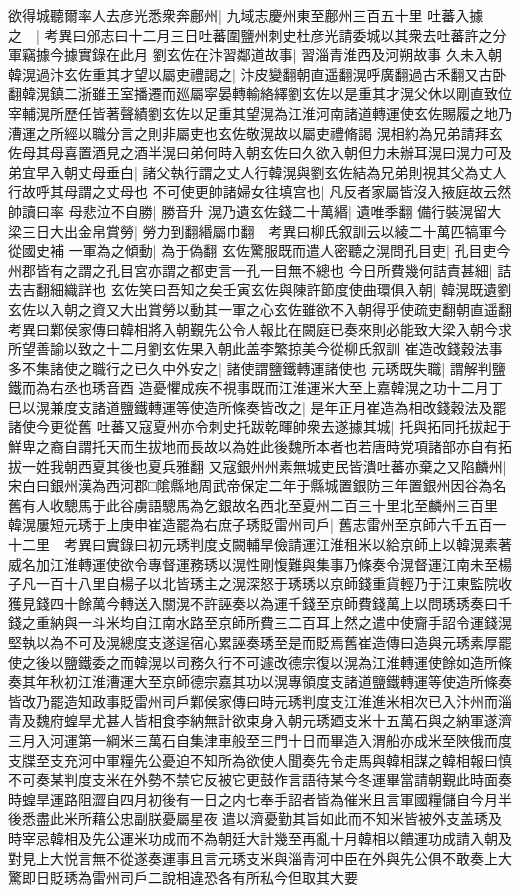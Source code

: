 欲得城聽爾率人去彦光悉衆奔鄜州|{
	九域志慶州東至鄜州三百五十里}
吐蕃入據之　|{
	考異曰邠志曰十二月三日吐蕃圍鹽州刺史杜彦光請委城以其衆去吐蕃許之分軍竊據今據實錄在此月}
劉玄佐在汴習鄰道故事|{
	習淄青淮西及河朔故事}
久未入朝韓滉過汴玄佐重其才望以屬吏禮謁之|{
	汴皮變翻朝直遥翻滉呼廣翻過古禾翻又古卧翻韓滉鎮二浙雖王室播遷而廵屬寜晏轉輸絡繹劉玄佐以是重其才滉父休以剛直致位宰輔滉所歷任皆著聲績劉玄佐以足重其望滉為江淮河南諸道轉運使玄佐賜履之地乃漕運之所經以職分言之則非屬吏也玄佐敬滉故以屬吏禮脩謁}
滉相約為兄弟請拜玄佐母其母喜置酒見之酒半滉曰弟何時入朝玄佐曰久欲入朝但力未辦耳滉曰滉力可及弟宜早入朝丈母垂白|{
	諸父執行謂之丈人行韓滉與劉玄佐結為兄弟則視其父為丈人行故呼其母謂之丈母也}
不可使更帥諸婦女往填宫也|{
	凡反者家屬皆沒入掖庭故云然帥讀曰率}
母悲泣不自勝|{
	勝音升}
滉乃遺玄佐錢二十萬緡|{
	遺唯季翻}
備行裝滉留大梁三日大出金帛賞勞|{
	勞力到翻緡屬巾翻　考異曰柳氏叙訓云以綾二十萬匹犒軍今從國史補}
一軍為之傾動|{
	為于偽翻}
玄佐驚服既而遣人密聽之滉問孔目吏|{
	孔目吏今州郡皆有之謂之孔目宮亦謂之都吏言一孔一目無不總也}
今日所費幾何詰責甚細|{
	詰去吉翻細織詳也}
玄佐笑曰吾知之矣壬寅玄佐與陳許節度使曲環俱入朝|{
	韓滉既遺劉玄佐以入朝之資又大出賞勞以動其一軍之心玄佐雖欲不入朝得乎使疏吏翻朝直遥翻　考異曰鄴侯家傳曰韓相將入朝覲先公令人報比在闕庭已奏來則必能致大梁入朝今求所望善諭以致之十二月劉玄佐果入朝此盖李繁掠美今從柳氏叙訓}
崔造改錢穀法事多不集諸使之職行之已久中外安之|{
	諸使謂鹽鐵轉運諸使也}
元琇既失職|{
	謂解判鹽鐵而為右丞也琇音酉}
造憂懼成疾不視事既而江淮運米大至上嘉韓滉之功十二月丁巳以滉兼度支諸道鹽鐵轉運等使造所條奏皆改之|{
	是年正月崔造為相改錢穀法及罷諸使今更從舊}
吐蕃又寇夏州亦令刺史托跋乾暉帥衆去遂據其城|{
	托與拓同托拔起于鮮卑之裔自謂托天而生拔地而長故以為姓此後魏所本者也若唐時党項諸部亦自有拓拔一姓我朝西夏其後也夏兵雅翻}
又寇銀州州素無城吏民皆潰吐蕃亦棄之又陷麟州|{
	宋白曰銀州漢為西河郡□隂縣地周武帝保定二年于縣城置銀防三年置銀州因谷為名舊有人收驄馬于此谷虜語驄馬為乞銀故名西北至夏州二百三十里北至麟州三百里}
韓滉屢短元琇于上庚申崔造罷為右庶子琇貶雷州司戶|{
	舊志雷州至京師六千五百一十二里　考異曰實錄曰初元琇判度攴闕輔旱儉請運江淮租米以給京師上以韓滉素著威名加江淮轉運使欲令專督運務琇以滉性剛愎難與集事乃條奏令滉督運江南未至楊子凡一百十八里自楊子以北皆琇主之滉深怒于琇琇以京師錢重貨輕乃于江東監院收獲見錢四十餘萬今轉送入關滉不許誣奏以為運千錢至京師費錢萬上以問琇琇奏曰千錢之重納與一斗米均自江南水路至京師所費三二百耳上然之遣中使齎手詔令運錢滉堅執以為不可及滉總度支遂逞宿心累誣奏琇至是而貶焉舊崔造傳曰造與元琇素厚罷使之後以鹽鐵委之而韓滉以司務久行不可遽改德宗復以滉為江淮轉運使餘如造所條奏其年秋初江淮漕運大至京師德宗嘉其功以滉專領度支諸道鹽鐵轉運等使造所條奏皆改乃罷造知政事貶雷州司戶鄴侯家傳曰時元琇判度支江淮進米相次已入汴州而淄青及魏府蝗旱尤甚人皆相食李納無計欲束身入朝元琇廼支米十五萬石與之納軍遂濟三月入河運第一綱米三萬石自集津車般至三門十日而畢造入渭船亦成米至陜俄而度支牒至支充河中軍糧先公憂迫不知所為欲使人聞奏先令走馬與韓相謀之韓相報曰慎不可奏某判度支米在外勢不禁它反被它更鼓作言語待某今冬運畢當請朝覲此時面奏時蝗旱運路阻澀自四月初後有一日之内七奉手詔者皆為催米且言軍國糧儲自今月半後悉盡此米所藉公忠副朕憂屬星夜遣以濟憂勤其旨如此而不知米皆被外支盖琇及時宰忌韓相及先公運米功成而不為朝廷大計幾至再亂十月韓相以饋運功成請入朝及對見上大悦言無不從遂奏運事且言元琇支米與淄青河中臣在外與先公俱不敢奏上大驚即日貶琇為雷州司戶二說相違恐各有所私今但取其大要}
